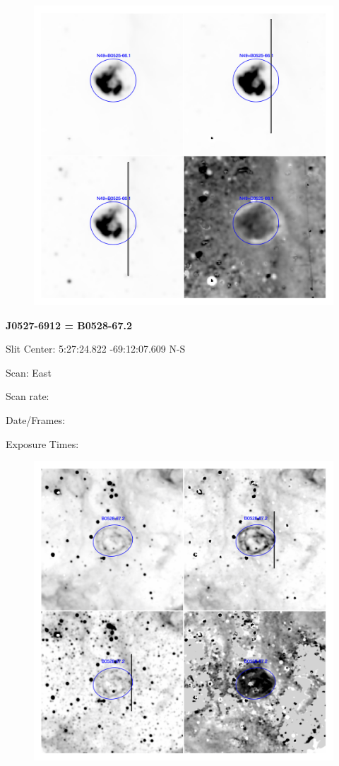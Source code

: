 \documentclass[11pt]{article}
\begin{document}
\begin{figure}
\includegraphics[width=11.cm]{snapshots/N49_5arcmin.png}
\end{figure}

\newpage
{\bf J0527-6912 = B0528-67.2}  
 
Slit Center:   5:27:24.822  -69:12:07.609 N-S

Scan:  East

Scan rate:  

Date/Frames:

Exposure Times:  

\begin{figure}
\includegraphics[width=11.cm]{snapshots/B0528-672.png}
\end{figure}
\end{document}
